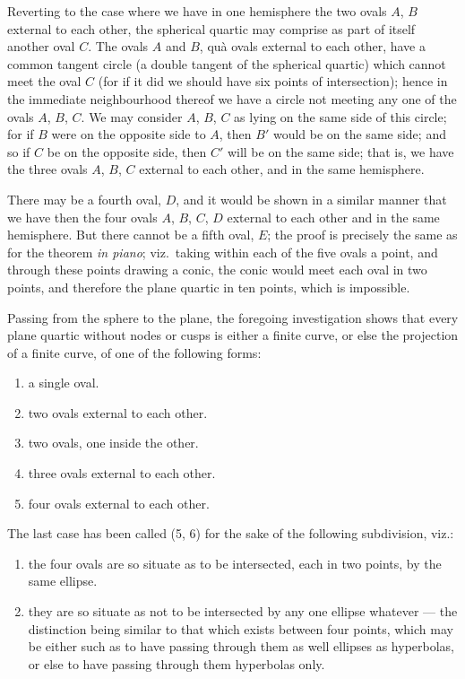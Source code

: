 \documentclass[11pt,a4paper]{article}
\theoremstyle{plain}
\begin{document}
Reverting to the case where we have in one hemisphere the two ovals $A$, $B$ external to each other, the spherical quartic may comprise as part of itself another oval $C$. The ovals $A$ and $B$, qu\`{a} ovals external to each other, have a common tangent circle (a double tangent of the spherical quartic) which cannot meet the oval $C$ (for if it did we should have six points of intersection); hence in the immediate neighbourhood thereof we have a circle not meeting any one of the ovals $A$, $B$, $C$. We may consider $A$, $B$, $C$ as lying on the same side of this circle; for if $B$ were on the opposite side to $A$, then $B'$ would be on the same side; and so if $C$ be on the opposite side, then $C'$ will be on the same side; that is, we have the three ovals $A$, $B$, $C$ external to each other, and in the same hemisphere.

There may be a fourth oval, $D$, and it would be shown in a similar manner that we have then the four ovals $A$, $B$, $C$, $D$ external to each other and in the same hemisphere. But there cannot be a fifth oval, $E$; the proof is precisely the same as for the theorem \textit{in piano}; viz.\ taking within each of the five ovals a point, and through these points drawing a conic, the conic would meet each oval in two points, and therefore the plane quartic in ten points, which is impossible.

Passing from the sphere to the plane, the foregoing investigation shows that every plane quartic without nodes or cusps is either a finite curve, or else the projection of a finite curve, of one of the following forms:
\begin{enumerate}
\item a single oval.
\item two ovals external to each other.
\item two ovals, one inside the other.
\item three ovals external to each other.
\item four ovals external to each other.
\end{enumerate}
The last case has been called (5, 6) for the sake of the following subdivision, viz.:
\begin{enumerate}
\item[5.] the four ovals are so situate as to be intersected, each in two points, by the same ellipse.
\item[6.] they are so situate as not to be intersected by any one ellipse whatever --- the distinction being similar to that which exists between four points, which may be either such as to have passing through them as well ellipses as hyperbolas, or else to have passing through them hyperbolas only.
\end{enumerate}
\end{document}
